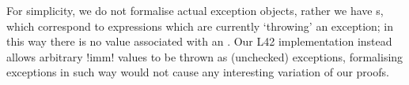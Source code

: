 For simplicity, we do not formalise actual exception objects, rather we have \error{}s, which correspond to expressions which are currently  `throwing' an exception;
in this way there is no value associated with an \error.
Our L42 implementation instead allows arbitrary \Q!imm! values to be thrown as (unchecked) exceptions, formalising exceptions in such way would not cause any interesting variation of our proofs.

\begin{figure}
	\begin{grammatica}
		\\
		\\
		\\
		
		\\

		\\

		\\
		\\
		
		\\
		\\
		\\
		
		\\


\end{grammatica}
\end{figure}
